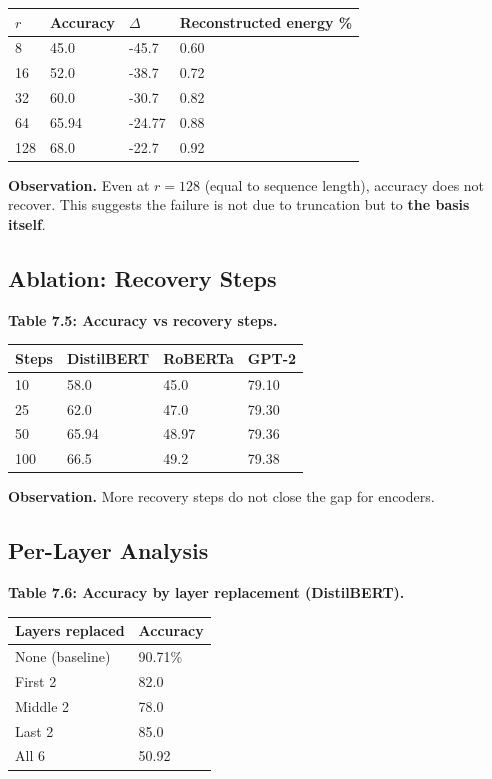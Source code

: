 \begin{table}[H]
\centering
\small
\begin{tabular}{llll}
\toprule
\textbf{$r$} & \textbf{Accuracy} & \textbf{$\Delta$} & \textbf{Reconstructed energy \%} \\
\midrule
8 & 45.0 & -45.7 & 0.60 \\
16 & 52.0 & -38.7 & 0.72 \\
32 & 60.0 & -30.7 & 0.82 \\
64 & 65.94 & -24.77 & 0.88 \\
128 & 68.0 & -22.7 & 0.92 \\
\bottomrule
\end{tabular}
\end{table}

\textbf{Observation.} Even at $r = 128$ (equal to sequence length), accuracy 
does not recover. This suggests the failure is not due to truncation but 
to \textbf{the basis itself}.

\subsection{Ablation: Recovery Steps}

\textbf{Table 7.5: Accuracy vs recovery steps.}

\begin{table}[H]
\centering
\small
\begin{tabular}{llll}
\toprule
\textbf{Steps} & \textbf{DistilBERT} & \textbf{RoBERTa} & \textbf{GPT-2} \\
\midrule
10 & 58.0 & 45.0 & 79.10 \\
25 & 62.0 & 47.0 & 79.30 \\
50 & 65.94 & 48.97 & 79.36 \\
100 & 66.5 & 49.2 & 79.38 \\
\bottomrule
\end{tabular}
\end{table}

\textbf{Observation.} More recovery steps do not close the gap for encoders.

\subsection{Per-Layer Analysis}

\textbf{Table 7.6: Accuracy by layer replacement (DistilBERT).}

\begin{table}[H]
\centering
\small
\begin{tabular}{ll}
\toprule
\textbf{Layers replaced} & \textbf{Accuracy} \\
\midrule
None (baseline) & 90.71\% \\
First 2 & 82.0 \\
Middle 2 & 78.0 \\
Last 2 & 85.0 \\
All 6 & 50.92 \\
\bottomrule
\end{tabular}
\end{table}

